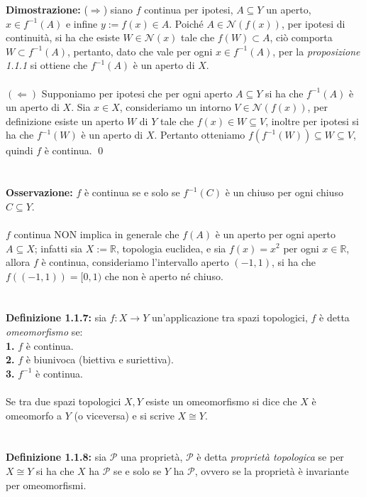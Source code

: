 \documentclass{article}
\begin{document}
\textbf{Dimostrazione:} ($\Rightarrow$) siano $f$ continua per ipotesi, $A \subseteq Y$ un aperto, \\ $x \in f^{-1}(A)$ e infine $y := f(x) \in A$. Poiché $A \in \mathcal{N}(f(x))$, per ipotesi di continuità, si ha che esiste $W \in \mathcal{N}(x)$ tale che $f(W) \subset A$, ciò comporta $W \subset f^{-1}(A)$, pertanto, dato che vale per ogni $x \in f^{-1}(A)$, per la \textit{proposizione 1.1.1} si ottiene che $f^{-1}(A)$ è un aperto di $X$. \\ \\
$(\Leftarrow)$ Supponiamo per ipotesi che per ogni aperto $A \subseteq Y$ si ha che $f^{-1}(A)$ è un aperto di $X$. Sia $x \in X$, consideriamo un intorno $V \in \mathcal{N}(f(x))$, per definizione esiste un aperto $W$ di $Y$ tale che $f(x) \in W \subseteq V$, inoltre per ipotesi si ha che $f^{-1}(W)$ è un aperto di $X$. Pertanto otteniamo $f(f^{-1}(W)) \subseteq W \subseteq V$, quindi $f$ è continua. \qed \\ \\ \\
\textbf{Osservazione:} $f$ è continua se e solo se $f^{-1}(C)$ è un chiuso per ogni chiuso $C \subseteq Y$. \\ \\
$f$ continua NON implica in generale che $f(A)$ è un aperto per ogni aperto $A \subseteq X$; infatti sia $X := \mathbb{R}$, topologia euclidea, e sia $f(x) = x^2$ per ogni $x \in \mathbb{R}$, allora $f$ è continua, consideriamo l'intervallo aperto $(-1, 1)$, si ha che $f((-1, 1)) = [0, 1)$ che non è aperto né chiuso. \\ \\ \\
\textbf{Definizione 1.1.7:} sia $f : X \longrightarrow Y$ un'applicazione tra spazi topologici, $f$ è detta \textit{omeomorfismo} se: \\
\textbf{1.} $f$ è continua. \\
\textbf{2.} $f$ è biunivoca (biettiva e suriettiva). \\
\textbf{3.} $f^{-1}$ è continua. \\ \\
Se tra due spazi topologici $X, Y$ esiste un omeomorfismo si dice che $X$ è omeomorfo a $Y$ (o viceversa) e si scrive $X \cong Y$. \\ \\ \\
\textbf{Definizione 1.1.8:} sia $\mathcal{P}$ una proprietà, $\mathcal{P}$ è detta \textit{proprietà topologica} se per $X \cong Y$ si ha che $X$ ha $\mathcal{P}$ se e solo se $Y$ ha $\mathcal{P}$, ovvero se la proprietà è invariante per omeomorfismi. \\ \\ \\
\end{document}
